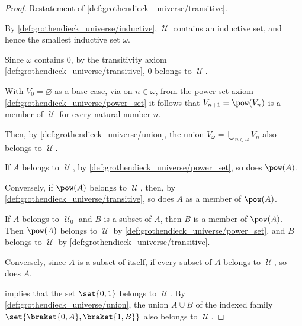 \begin{proof}
   Restatement of \ref{def:grothendieck_universe/transitive}.

   By \ref{def:grothendieck_universe/inductive}, \( \mscrU \) contains an inductive set, and hence the smallest inductive set \( \omega \).

  Since \( \omega \) contains \( 0 \), by the transitivity axiom \ref{def:grothendieck_universe/transitive}, \( 0 \) belongs to \( \mscrU \).

  With \( V_0 = \varnothing \) as a base case, via  on \( n \in \omega \), from the power set axiom \ref{def:grothendieck_universe/power_set} it follows that \( V_{n+1} = \pow(V_n) \) is a member of \( \mscrU \) for every natural number \( n \).

  Then, by \ref{def:grothendieck_universe/union}, the union \( V_\omega = \bigcup_{n \in \omega} V_n \) also belongs to \( \mscrU \).


  \SufficiencySubProof* If \( A \) belongs to \( \mscrU \), by \ref{def:grothendieck_universe/power_set}, so does \( \pow(A) \).

  \NecessitySubProof* Conversely, if \( \pow(A) \) belongs to \( \mscrU \), then, by \ref{def:grothendieck_universe/transitive}, so does \( A \) as a member of \( \pow(A) \).


  \SufficiencySubProof* If \( A \) belongs to \( \mscrU_0 \) and \( B \) is a subset of \( A \), then \( B \) is a member of \( \pow(A) \). Then \( \pow(A) \) belongs to \( \mscrU \) by \ref{def:grothendieck_universe/power_set}, and \( B \) belongs to \( \mscrU \) by \ref{def:grothendieck_universe/transitive}.

  \NecessitySubProof* Conversely, since \( A \) is a subset of itself, if every subset of \( A \) belongs to \( \mscrU \), so does \( A \).


  \SufficiencySubProof* {} implies that the set \( \set{ 0, 1 } \) belongs to \( \mscrU \). By \ref{def:grothendieck_universe/union}, the union \( A \cup B \) of the indexed family \( \set{ \braket{ 0, A }, \braket{ 1, B } } \) also belongs to \( \mscrU \).


\end{proof}
